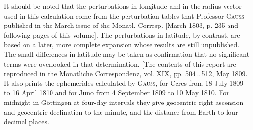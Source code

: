 \par\noindent It should be noted that the perturbations in longitude and in the radius vector used in this calculation come from the perturbation tables that Professor \textsc{Gauss} published in the March issue of the Monatl. Corresp. [March 1803, p. 235 and following pages of this volume]. The perturbations in latitude, by contrast, are based on a later, more complete expansion whose results are still unpublished. The small differences in latitude may be taken as confirmation that no significant terms were overlooked in that determination. [The contents of this report are reproduced in the Monatliche Correspondenz, vol. XIX, pp. 504\,..\,512, May 1809. It also prints the ephemerides calculated by \textsc{Gauss}, for Ceres from 18 July 1809 to 16 April 1810 and for Juno from 4 September 1809 to 10 May 1810. For midnight in Göttingen at four-day intervals they give geocentric right ascension and geocentric declination to the minute, and the distance from Earth to four decimal places.]

